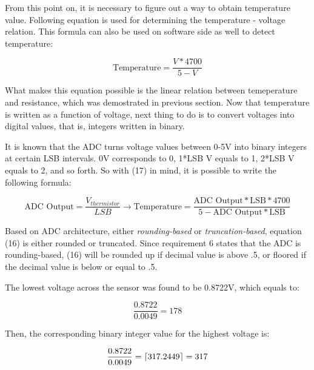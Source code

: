 From this point on, it is necessary to figure out a way to obtain temperature value. Following equation is used for determining the temperature - voltage relation. This formula can also be used on software side as well to detect temperature:

\begin{equation}
    \text{Temperature} = \frac{V*4700}{5 - V}
\end{equation}

What makes this equation possible is the linear relation between temeperature and resistance, which was demostrated in previous section. Now that temperature is written as a function of voltage, next thing to do is to convert voltages into digital values, that is, integers written in binary.

It is known that the ADC turns voltage values between 0-5V into binary integers at certain LSB intervals. 0V corresponds to 0, 1*LSB V equals to 1, 2*LSB V equals to 2, and so forth. So with (17) in mind, it is possible to write the following formula:

\begin{equation}
    \text{ADC Output} = \frac{V_{thermistor}}{LSB} \rightarrow \text{Temperature} = \frac{\text{ADC Output}*\text{LSB}*4700}{5 - \text{ADC Output}*\text{LSB}}
\end{equation}

Based on ADC architecture, either \textit{rounding-based} or \textit{truncation-based}, equation (16) is either rounded or truncated. Since requirement 6 states that the ADC is rounding-based, (16) will be rounded up if decimal value is above .5, or floored if the decimal value is below or equal to .5.

The lowest voltage across the sensor was found to be 0.8722V, which equals to:

\begin{equation}
    \frac{0.8722}{0.0049} = 178
\end{equation}

Then, the corresponding binary integer value for the highest voltage is:

\begin{equation}
    \frac{0.8722}{0.0049} = \ceil*{317.2449}  = 317
\end{equation}



